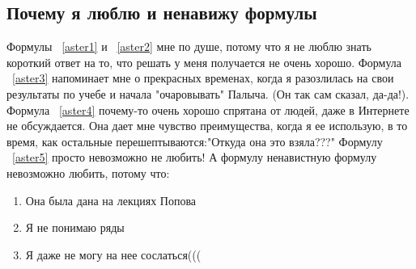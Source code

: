\documentclass[10pt, a4paper]{article}  %
\begin{document}
\subsection*{Почему я люблю и ненавижу формулы}

Формулы ~\ref{aster1} и ~\ref{aster2} мне по душе, потому что я не люблю знать короткий ответ на то, что решать у меня получается не очень хорошо. Формула ~\ref{aster3} напоминает мне о прекрасных временах, когда я разозлилась на свои результаты по учебе и начала "очаровывать" Палыча. (Он так сам сказал, да-да!). Формула ~\ref{aster4} почему-то очень хорошо спрятана от людей, даже в Интернете не обсуждается. Она дает мне чувство преимущества, когда я ее использую, в то время, как остальные перешептываются:"Откуда она это взяла???" Формулу ~\ref{aster5} просто невозможно не любить!
 А формулу ненавистную формулу невозможно любить, потому что:
\begin{enumerate}
\item Она была дана на лекциях Попова
\item Я не понимаю ряды 
\item Я даже не могу на нее сослаться(((
\end{enumerate}
\end{document}
